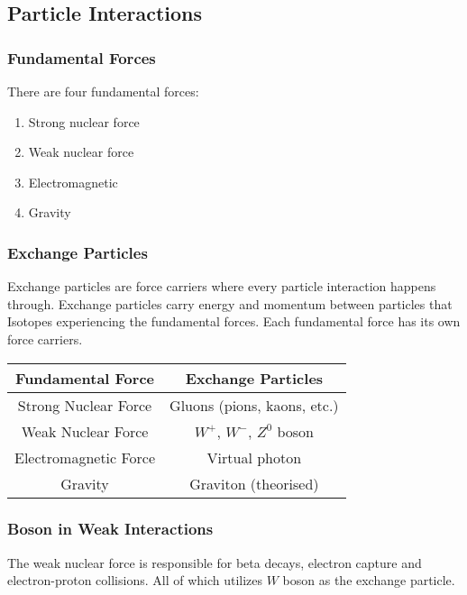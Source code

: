 \documentclass[10pt]{article}
\makeatletter
\newenvironment{tablehere}
  {\def\@captype{table}}
  {}
\makeatother
\begin{document}
\begin{multicols*}{2}
	\subsection{Particle Interactions}
	\subsubsection{Fundamental Forces}
	There are four fundamental forces:
	\medskip
	\begin{enumerate}
		\item Strong nuclear force
		\item Weak nuclear force
		\item Electromagnetic
		\item Gravity
	\end{enumerate}

	\subsubsection{Exchange Particles}
	Exchange particles are force carriers where every particle interaction happens
	through. Exchange particles carry energy and momentum between particles that
	Isotopes experiencing the fundamental forces. Each fundamental force has its own
	force carriers.

	\begin{center}
		\begin{tablehere}
			\begin{tabular}{|c|c|}
				\hline
				Fundamental Force     & Exchange Particles          \\
				\hline
				Strong Nuclear Force  & Gluons (pions, kaons, etc.) \\
				Weak Nuclear Force    & $W^+$, $W^-$, $Z^0$ boson   \\
				Electromagnetic Force & Virtual photon              \\
				Gravity               & Graviton (theorised)        \\
				\hline
			\end{tabular}
		\end{tablehere}
	\end{center}

	\subsubsection{Boson in Weak Interactions}
	The weak nuclear force is responsible for beta decays, electron capture and
	electron-proton collisions. All of which utilizes $W$ boson as the exchange
	particle.


\end{multicols*}
\end{document}
